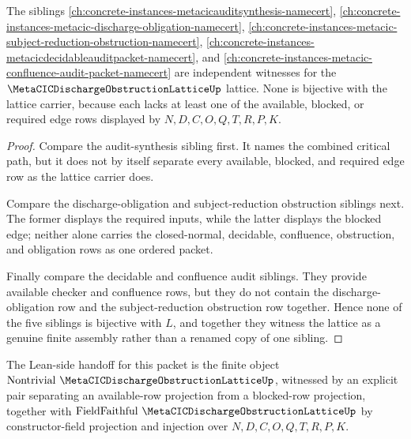 \begin{theorem}
\label{thm:metacic-discharge-obstruction-lattice-independence-witness}
The siblings \autoref{ch:concrete-instances-metacicauditsynthesis-namecert}, \autoref{ch:concrete-instances-metacic-discharge-obligation-namecert}, \autoref{ch:concrete-instances-metacic-subject-reduction-obstruction-namecert}, \autoref{ch:concrete-instances-metacicdecidableauditpacket-namecert}, and \autoref{ch:concrete-instances-metacic-confluence-audit-packet-namecert} are independent witnesses for the $\MetaCICDischargeObstructionLatticeUp$ lattice. None is bijective with the lattice carrier, because each lacks at least one of the available, blocked, or required edge rows displayed by $N,D,C,O,Q,T,R,P,K$.
\end{theorem}
\begin{proof}
Compare the audit-synthesis sibling first. It names the combined critical path, but it does not by itself separate every available, blocked, and required edge row as the lattice carrier does.

Compare the discharge-obligation and subject-reduction obstruction siblings next. The former displays the required inputs, while the latter displays the blocked edge; neither alone carries the closed-normal, decidable, confluence, obstruction, and obligation rows as one ordered packet.

Finally compare the decidable and confluence audit siblings. They provide available checker and confluence rows, but they do not contain the discharge-obligation row and the subject-reduction obstruction row together. Hence none of the five siblings is bijective with $L$, and together they witness the lattice as a genuine finite assembly rather than a renamed copy of one sibling.
\end{proof}

The Lean-side handoff for this packet is the finite object $\mathrm{Nontrivial}\ \MetaCICDischargeObstructionLatticeUp$, witnessed by an explicit pair separating an available-row projection from a blocked-row projection, together with $\mathrm{FieldFaithful}\ \MetaCICDischargeObstructionLatticeUp$ by constructor-field projection and injection over $N,D,C,O,Q,T,R,P,K$.


